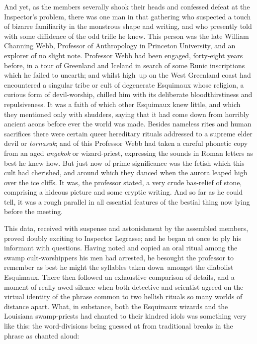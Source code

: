 And yet, as the members severally shook their heads and confessed defeat
at the Inspector's problem, there was one man in that gathering who
suspected a touch of bizarre familiarity in the monstrous shape and
writing, and who presently told with some diffidence of the odd trifle
he knew. This person was the late William Channing Webb, Professor of
Anthropology in Princeton University, and an explorer of no slight note.
Professor Webb had been engaged, forty-eight years before, in a tour of
Greenland and Iceland in search of some Runic inscriptions which he
failed to unearth; and whilst high\est\ up on the West Greenland coast had
encountered a singular tribe or cult of degenerate Esquimaux whose
religion, a curious form of devil-worship, chilled him with its
deliberate bloodthirstiness and repulsiveness. It was a faith of which
other Esquimaux knew little, and which they mentioned only with
shudders, saying that it had come down from horribly ancient aeons
before ever the world was made. Besides nameless rites and human
sacrifices there were certain queer hereditary rituals addressed to a
supreme elder devil or \emph{tornasuk}; and of this Professor Webb had taken a
careful phonetic copy from an aged \emph{angekok} or wizard-priest, expressing
the sounds in Roman letters as best he knew how. But just now of prime
significance was the fetish which this cult had cherished, and around
which they danced when the aurora leaped high over the ice cliffs. It
was, the professor stated, a very crude bas-relief of stone, comprising
a hideous picture and some cryptic writing. And so far as he could tell,
it was a rough parallel in all essential features of the bestial thing
now lying before the meeting.

This data, received with suspense and astonishment by the assembled
members, proved doubly exciting to Inspector Legrasse; and he began at
once to ply his informant with questions. Having noted and copied an
oral ritual among the swamp cult-worshippers his men had arrested, he
besought the professor to remember as best he might the syllables taken
down\est\ amongst the diabolist Esquimaux. There then followed an exhaustive
comparison of details, and a moment of really awed silence when both
detective and scientist agreed on the virtual identity of the phrase
common to two hellish rituals so many worlds of distance apart. What, in
substance, both the Esquimaux wizards and the Louisiana swamp-priests
had chanted to their kindred idols was something very like this: the
word-divisions being guessed at from traditional breaks in the phrase as
chanted aloud:

